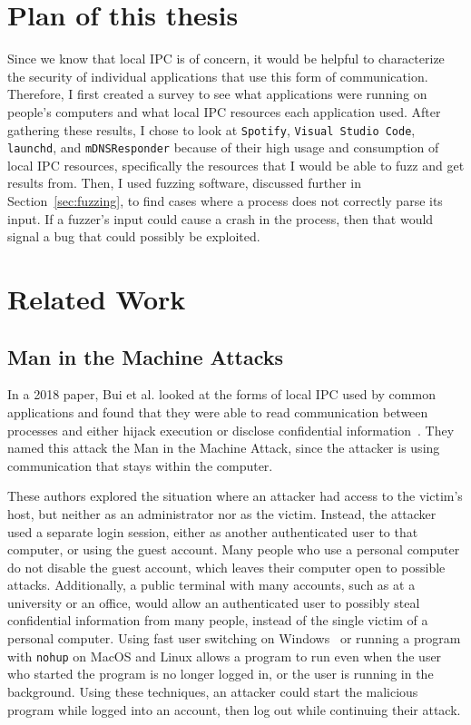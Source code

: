 \section{Plan of this thesis}
\label{sec:planOfThesis}
Since we know that local IPC is of concern, it would be helpful to characterize the security of individual applications that use this form of communication.  Therefore, I first created a survey to see what applications were running on people's computers and what local IPC resources each application used.  After gathering these results, I chose to look at \texttt{Spotify}, \texttt{Visual Studio Code}, \texttt{launchd}, and \texttt{mDNSResponder} because of their high usage and consumption of local IPC resources, specifically the resources that I would be able to fuzz and get results from.  Then, I used fuzzing software, discussed further in Section~\ref{sec:fuzzing}, to find cases where a process does not correctly parse its input.  If a fuzzer's input could cause a crash in the process, then that would signal a bug that could possibly be exploited.


\section{Related Work}
\label{sec:relatedWork}
\subsection{Man in the Machine Attacks}
\label{sec:manInMachineAttack}
In a 2018 paper, Bui et al. looked at the forms of local IPC used by common applications and found that they were able to read communication between processes and either hijack execution or disclose confidential information~\cite{MitMa}.  They named this attack the Man in the Machine Attack, since the attacker is using communication that stays within the computer.

These authors explored the situation where an attacker had access to the victim's host, but neither as an administrator nor as the victim.  Instead, the attacker used a separate login session, either as another authenticated user to that computer, or using the guest account.  Many people who use a personal computer do not disable the guest account, which leaves their computer open to possible attacks.  Additionally, a public terminal with many accounts, such as at a university or an office, would allow an authenticated user to possibly steal confidential information from many people, instead of the single victim of a personal computer.  Using fast user switching on Windows~\cite{microsoft_developers_network_2018} or running a program with \texttt{nohup} on MacOS and Linux allows a program to run even when the user who started the program is no longer logged in, or the user is running in the background.  Using these techniques, an attacker could start the malicious program while logged into an account, then log out while continuing their attack.

